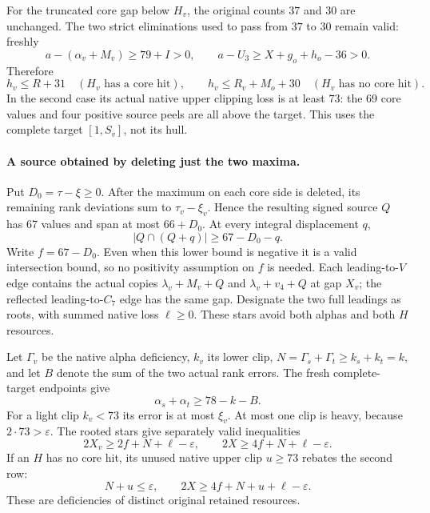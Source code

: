 \documentclass[10pt,a4paper]{article}
\theoremstyle{definition}
\begin{document}
For the truncated core gap below $H_v$, the original counts $37$ and
$30$ are unchanged. The two strict eliminations used to pass from
$37$ to $30$ remain valid: freshly
\[
 a-(\alpha_v+M_v)\ge79+I>0,\qquad
 a-U_3\ge X+g_o+h_o-36>0.
\]
Therefore
\begin{equation}\label{eq:85-ownerless-H}
 h_v\le R+31\quad(H_v\text{ has a core hit}),\qquad
 h_v\le R_v+M_o+30\quad(H_v\text{ has no core hit}).
\end{equation}
In the second case its actual native upper clipping loss is at least
$73$: the 69 core values and four positive source peels are all above
the target. This uses the complete target $[1,S_v]$, not its hull.

\paragraph{A source obtained by deleting just the two maxima.}
Put $D_0=\tau-\xi\ge0$. After the maximum on each core side is
deleted, its remaining rank deviations sum to $\tau_v-\xi_v$.
Hence the resulting signed source $Q$ has 67 values and span at most
$66+D_0$. At every integral displacement $q$,
\[
 |Q\cap(Q+q)|\ge67-D_0-q.
\]
Write $f=67-D_0$. Even when this lower bound is negative it is a valid
intersection bound, so no positivity assumption on $f$ is needed.
Each leading-to-$V$ edge contains the actual copies
$\lambda_v+M_v+Q$ and $\lambda_v+v_4+Q$ at gap $X_v$;
the reflected leading-to-$C_7$ edge has the same gap.
Designate the two full leadings as roots, with summed native loss
$\ell\ge0$. These stars avoid both alphas and both $H$ resources.

Let $\Gamma_v$ be the native alpha deficiency, $k_v$ its lower clip,
$N=\Gamma_s+\Gamma_t\ge k_s+k_t=k$, and let $B$ denote the sum of
the two actual rank errors. The fresh complete-target endpoints give
\[
 \alpha_s+\alpha_t\ge78-k-B.
\]
For a light clip $k_v<73$ its error is at most $\xi_v$.
At most one clip is heavy, because $2\cdot73>\varepsilon$.
The rooted stars give separately valid inequalities
\begin{equation}\label{eq:85-ownerless-stars}
 2X_v\ge2f+N+\ell-\varepsilon,\qquad
 2X\ge4f+N+\ell-\varepsilon.
\end{equation}
If an $H$ has no core hit, its unused native upper clip $u\ge73$
rebates the second row:
\begin{equation}\label{eq:85-ownerless-stars-H}
 N+u\le\varepsilon,\qquad
 2X\ge4f+N+u+\ell-\varepsilon.
\end{equation}
These are deficiencies of distinct original retained resources.
\end{document}
